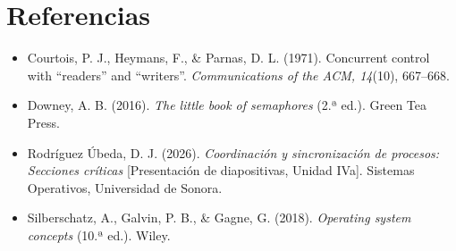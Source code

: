 \documentclass[12pt,letterpaper]{article}
\theoremstyle{definition}
\begin{document}
\newpage
\section*{Referencias}
\begin{itemize}[leftmargin=1.5em,itemsep=7pt]
\item[] Courtois, P. J., Heymans, F., \& Parnas, D. L. (1971). Concurrent control with ``readers'' and ``writers''. \emph{Communications of the ACM, 14}(10), 667--668.
\item[] Downey, A. B. (2016). \emph{The little book of semaphores} (2.ª ed.). Green Tea Press.
\item[] Rodríguez Úbeda, D. J. (2026). \emph{Coordinación y sincronización de procesos: Secciones críticas} [Presentación de diapositivas, Unidad IVa]. Sistemas Operativos, Universidad de Sonora.
\item[] Silberschatz, A., Galvin, P. B., \& Gagne, G. (2018). \emph{Operating system concepts} (10.ª ed.). Wiley.
\end{itemize}
\end{document}
